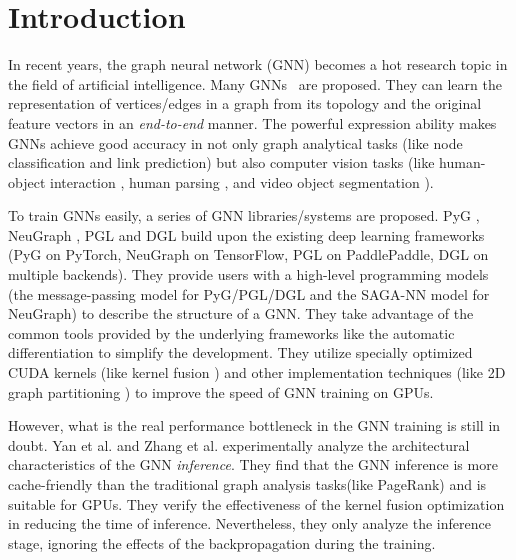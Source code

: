 \section{Introduction}

In recent years, the graph neural network (GNN) becomes a hot research topic in the field of artificial intelligence.
Many GNNs~\cite{kipf2017_gcn, defferrad2016_chebnet, li2018_agcn,li2015_ggnn, hamilton2017_graphsage, huang2018_gat, zhang2018_gaan} are proposed.
They can learn the representation of vertices/edges in a graph from its topology and the original feature vectors in an \emph{end-to-end} manner.
The powerful expression ability makes GNNs achieve good accuracy in not only graph analytical tasks \cite{zhou2018_gnn_review, zhang2018_gnn_survey, comprehensive-survey-wu-2020} (like node classification and link prediction) but also computer vision tasks (like human-object interaction \cite{qi2018_learning_humanobject}, human parsing \cite{wang2020_hierarchical_human_parsing}, and video object segmentation \cite{wang2019_zeroshot_video}).

To train GNNs easily, a series of GNN libraries/systems \cite{PyG, DGL, ma2019_neugraph, zhu2019_aligraph, PGL} are proposed.
PyG \cite{PyG}, NeuGraph \cite{ma2019_neugraph}, PGL \cite{PGL} and DGL \cite{DGL} build upon the existing deep learning frameworks (PyG on PyTorch, NeuGraph on TensorFlow, PGL on PaddlePaddle, DGL on multiple backends).
They provide users with a high-level programming models (the message-passing model for PyG/PGL/DGL and the SAGA-NN model for NeuGraph) to describe the structure of a GNN.
They take advantage of the common tools provided by the underlying frameworks like the automatic differentiation to simplify the development.
They utilize specially optimized CUDA kernels (like kernel fusion \cite{DGL} \cite{ma2019_neugraph}) and other implementation techniques (like 2D graph partitioning \cite{ma2019_neugraph}) to improve the speed of GNN training on GPUs.

However, what is the real performance bottleneck in the GNN training is still in doubt.
Yan et al. \cite{yan2020_characterizing_gcn} and Zhang et al. \cite{zhang2020_analysis_neugraph} experimentally analyze the architectural characteristics of the GNN \emph{inference}.
They find that the GNN inference is more cache-friendly than the traditional graph analysis tasks(like PageRank) and is suitable for GPUs.
They verify the effectiveness of the kernel fusion optimization in reducing the time of inference.
Nevertheless, they only analyze the inference stage, ignoring the effects of the backpropagation during the training.

